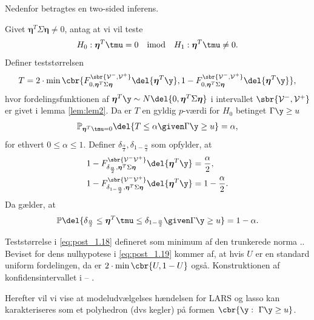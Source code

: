 Nedenfor betragtes en two-sided inferens.
%
\begin{lem} \label{lem:lem4}
Givet \(\boldsymbol{\eta}^T \Sigma \boldsymbol{\eta} \neq 0\), antag at vi vil teste
\begin{align*}
H_0: \boldsymbol{\eta}^T \tmu=0 \quad \text{imod} \quad H_1: \boldsymbol{\eta}^T \tmu \neq 0.
\end{align*}
Definer teststørrelsen
\begin{align}
T=2 \cdot \min\cbr{F_{0, \boldsymbol{\eta}^T \Sigma \boldsymbol{\eta}}^{\sbr{\mathcal{V}^-, \mathcal{V}^+}} \del{\boldsymbol{\eta}^T \y}, 1 - F_{0, \boldsymbol{\eta}^T \Sigma \boldsymbol{\eta}}^{\sbr{\mathcal{V}^-, \mathcal{V}^+}} \del{\boldsymbol{\eta}^T \y}}, \label{eq:post_1.18}
\end{align}
hvor fordelingsfunktionen af \(\boldsymbol{\eta}^T \y \sim N \del{0,  \boldsymbol{\eta}^T \Sigma \boldsymbol{\eta}}\) i intervallet \(\sbr{\mathcal{V}^-, \mathcal{V}^+}\) er givet i lemma \ref{lem:lem2}.
Da er \(T\) en gyldig \(p\)-værdi for \(H_0\) betinget \(\Gamma \y \geq u\)
\begin{align}
\mathbb{P}_{\boldsymbol{\eta}^T \tmu=0} \del{T \leq \alpha \given \Gamma \y \geq u} = \alpha, \label{eq:post_1.19}
\end{align}
for ethvert \(0 \leq \alpha \leq 1\). 
Definer \(\delta_{\frac{\alpha}{2}}, \delta_{1-\frac{\alpha}{2}}\) som opfylder, at
\begin{align*}
1-F_{\delta_{\frac{\alpha}{2}}, \boldsymbol{\eta}^T \Sigma \boldsymbol{\eta}}^{\sbr{\mathcal{V}^- \mathcal{V}^+}} \del{\boldsymbol{\eta}^T \y} &= \frac{\alpha}{2}, \\
1-F_{\delta_{1-\frac{\alpha}{2}}, \boldsymbol{\eta}^T \Sigma \boldsymbol{\eta} }^{\sbr{\mathcal{V}^- \mathcal{V}^+}} \del{\boldsymbol{\eta}^T \y} &= 1-\frac{\alpha}{2}.
\end{align*}
Da gælder, at
\begin{align*}
\mathbb{P} \del{\delta_{\frac{\alpha}{2}} \leq  \boldsymbol{\eta}^T \tmu \leq \delta_{1-\frac{\alpha}{2}} \given \Gamma \y \geq u} = 1- \alpha.
\end{align*}
\end{lem}
%
Teststørrelse i \eqref{eq:post_1.18} defineret som minimum af den trunkerede norma ..
Beviset for dens nulhypotese i \eqref{eq:post_1.19} kommer af, at hvis \(U\) er en standard uniform fordelingen, da er \(2 \cdot \min \cbr{U,1-U}\) også.
Konstruktionen af konfidensintervallet i -- .


Herefter vil vi vise at modeludvælgelses hændelsen for LARS og lasso kan karakteriseres som et polyhedron (dvs kegler) på formen \(\cbr{\y : \ \Gamma \y \geq u}\).

